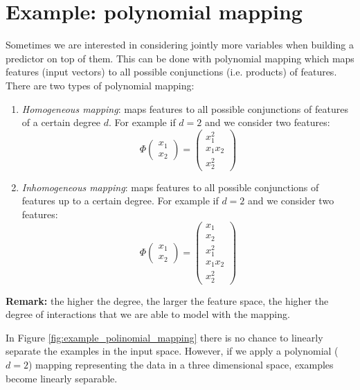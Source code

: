 \section{Example: polynomial mapping}
Sometimes we are interested in considering jointly more variables when building a predictor on top of them. This can be done with polynomial mapping which maps features (input vectors) to all possible conjunctions (i.e. products) of features. There are two types of polynomial mapping:
\begin{enumerate}
    \item \textit{Homogeneous mapping}: maps features to all possible conjunctions of features of a certain degree $d$. For example if $d=2$ and we consider two features:
    $$\Phi(\begin{matrix}x_{1} \\ x_{2}\end{matrix}) = \begin{pmatrix} x_1^2 \\ x_1 x_2 \\ x_2^2 \end{pmatrix}$$
    
    \item \textit{Inhomogeneous mapping}: maps features to all possible conjunctions of features up to a certain degree. For example if $d=2$ and we consider two features:
    $$\Phi(\begin{matrix}x_{1} \\ x_{2}\end{matrix}) = \begin{pmatrix} x_1 \\ x_2 \\ x_1^2 \\ x_1 x_2 \\ x_2^2 \end{pmatrix}$$
\end{enumerate}

\textbf{Remark:} the higher the degree, the larger the feature space, the higher the degree of interactions that we are able to model with the mapping. \newline

In Figure \ref{fig:example_polinomial_mapping} there is no chance to linearly separate the examples in the input space. However, if we apply a polynomial ($d=2$) mapping representing the data in a three dimensional space, examples become linearly separable. \newline


